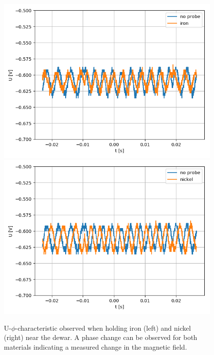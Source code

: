 \documentclass[12pt,a4paper]{article}
\begin{document}
\begin{figure}
\centering
\includegraphics[scale=0.5]{Bilder/eisen.png}
\includegraphics[scale=0.5]{Bilder/nickel.png}
\caption{U-$\phi$-characteristic observed when holding iron (left) and nickel (right) near the dewar. A phase change can be observed for both materials indicating a measured change in the magnetic field.}
\label{fig:qual}
\end{figure}
\end{document}
